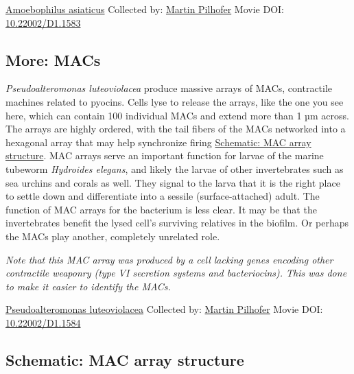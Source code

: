 \documentclass[]{tufte-book}
\begin{document}
\hypertarget{htmlwidget-7f42649efe0d63c6b21f}{}

\label{fig:9-7a}\protect\hyperlink{tree}{Amoebophilus asiaticus} Collected by: \protect\hyperlink{martin_pilhofer}{Martin Pilhofer} Movie DOI: \href{https://doi.org/10.22002/D1.1583}{10.22002/D1.1583}

\hypertarget{MACs}{%
\subsection*{More: MACs}\label{MACs}}

\emph{Pseudoalteromonas luteoviolacea} produce massive arrays of MACs, contractile machines related to pyocins. Cells lyse to release the arrays, like the one you see here, which can contain 100 individual MACs and extend more than 1 µm across. The arrays are highly ordered, with the tail fibers of the MACs networked into a hexagonal array that may help synchronize firing \protect\hyperlink{MAC_array_structure}{Schematic: MAC array structure}. MAC arrays serve an important function for larvae of the marine tubeworm \emph{Hydroides elegans}, and likely the larvae of other invertebrates such as sea urchins and corals as well. They signal to the larva that it is the right place to settle down and differentiate into a sessile (surface-attached) adult. The function of MAC arrays for the bacterium is less clear. It may be that the invertebrates benefit the lysed cell's surviving relatives in the biofilm. Or perhaps the MACs play another, completely unrelated role.

\emph{Note that this MAC array was produced by a cell lacking genes encoding other contractile weaponry (type VI secretion systems and bacteriocins). This was done to make it easier to identify the MACs.}



\hypertarget{htmlwidget-37e87624f765d297a9e2}{}

\label{fig:9-7b}\protect\hyperlink{tree}{Pseudoalteromonas luteoviolacea} Collected by: \protect\hyperlink{martin_pilhofer}{Martin Pilhofer} Movie DOI: \href{https://doi.org/10.22002/D1.1584}{10.22002/D1.1584}

\hypertarget{MAC_array_structure}{%
\subsection*{Schematic: MAC array structure}\label{MAC_array_structure}}
\end{document}
